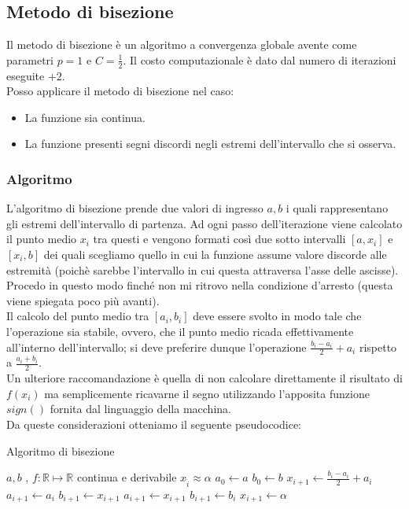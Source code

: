 \documentclass[12pt, a4paper]{book}
\theoremstyle{definition}
\begin{document}
\subsection{Metodo di bisezione}
\begin{flushleft}
Il metodo di bisezione è un algoritmo a convergenza globale avente come parametri $p=1$ e $C=\frac{1}{2}$. Il costo computazionale è dato dal numero di iterazioni eseguite $+ 2$. \\
\vspace{1em}
Posso applicare il metodo di bisezione nel caso: 
\begin{itemize}
	\item La funzione sia continua.
	\item La funzione presenti segni discordi negli estremi dell'intervallo che si osserva.
\end{itemize}

\subsubsection{Algoritmo}
L'algoritmo di bisezione prende due valori di ingresso $a,b$ i quali rappresentano gli estremi dell'intervallo di partenza. Ad ogni passo dell'iterazione viene calcolato il punto medio $x_{i}$ tra questi e vengono formati così due sotto intervalli $[a,x_{i}]$ e $[x_{i}, b]$ dei quali scegliamo quello in cui la funzione assume valore discorde alle estremità (poichè sarebbe l'intervallo in cui questa attraversa l'asse delle ascisse). Procedo in questo modo finché non mi ritrovo nella condizione d'arresto (questa viene spiegata poco più avanti). \\
\vspace{1em}
Il calcolo del punto medio tra $[a_{i},b_{i}]$ deve essere svolto in modo tale che l'operazione sia stabile, ovvero, che il punto medio ricada effettivamente all'interno dell'intervallo; si deve preferire dunque l'operazione $\frac{b_{i} - a_{i}}{2} + a_{i}$ rispetto a $\frac{a_{i}  + b_{i}}{2}$.\\
Un ulteriore raccomandazione è quella di non calcolare direttamente il risultato di $f(x_{i})$ ma semplicemente ricavarne il segno utilizzando l'apposita funzione $sign()$ fornita dal linguaggio della macchina.\\
\pagebreak
Da queste considerazioni otteniamo il seguente pseudocodice:
\begin{algorithm}
\caption{Algoritmo di bisezione}
	\begin{algorithmic} 
		\REQUIRE $a, b$ , $f: \mathbb{R} \mapsto \mathbb{R}$ continua e derivabile
		\ENSURE $x_{\hat{i}} \approx \alpha$
		\STATE $ a_{0} \leftarrow  a$
		\STATE $ b_{0} \leftarrow  b$
			\STATE $ x_{i+1} \leftarrow  \frac{b_{i} - a_{i}}{2} + a_{i}$
				\STATE $ a_{i+1} \leftarrow  a_{i}$
				\STATE $ b_{i+1} \leftarrow  x_{i+1}$
			\ENDIF
				\STATE $ a_{i+1} \leftarrow  x_{i+1}$
				\STATE $ b_{i+1} \leftarrow  b_{i}$
			\ENDIF
				\STATE $ x_{i+1} \leftarrow  \alpha$
			\ENDIF
		\ENDWHILE
	\end{algorithmic}
\end{algorithm}


\end{flushleft}
\end{document}
